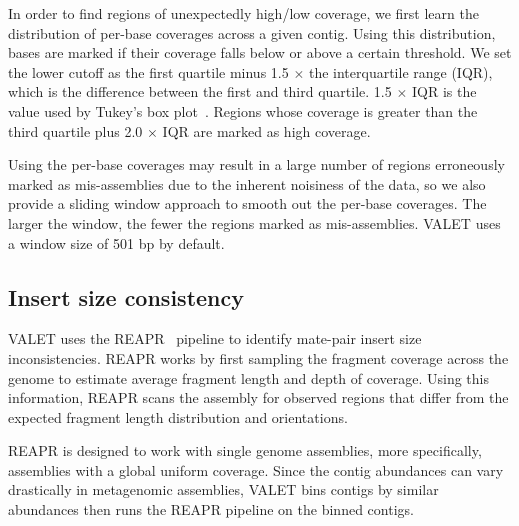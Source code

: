 \documentclass{bioinfo}
\begin{document}
In order to find regions of unexpectedly high/low coverage, we first learn the distribution of per-base coverages across a given contig.  Using this distribution, bases are marked if their coverage falls below or above a certain threshold.  We set the lower cutoff as the first quartile minus 1.5 $\times$ the interquartile range (IQR), which is the difference between the first and third quartile. 1.5 $\times$ IQR is the value used by Tukey’s box plot~\citep{mcgill1978variations}.  Regions whose coverage is greater than the third quartile plus 2.0 $\times$ IQR are marked as high coverage.

Using the per-base coverages may result in a large number of regions erroneously marked as mis-assemblies due to the inherent noisiness of the data, so we also provide a sliding window approach to smooth out the per-base coverages. The larger the window, the fewer the regions marked as mis-assemblies.
VALET uses a window size of 501 bp by default.

\subsection{Insert size consistency}


VALET uses the REAPR~\citep{hunt2013reapr} pipeline to identify mate-pair insert size inconsistencies.  REAPR works by first sampling the fragment coverage across the genome to estimate average fragment length and depth of coverage.  Using this information, REAPR scans the assembly for observed regions that differ from the expected fragment length distribution and orientations.

REAPR is designed to work with single genome assemblies, more specifically, assemblies with a global uniform coverage.  Since the contig abundances can vary drastically in metagenomic assemblies, VALET bins contigs by similar abundances then runs the REAPR pipeline on the binned contigs.
\end{document}
